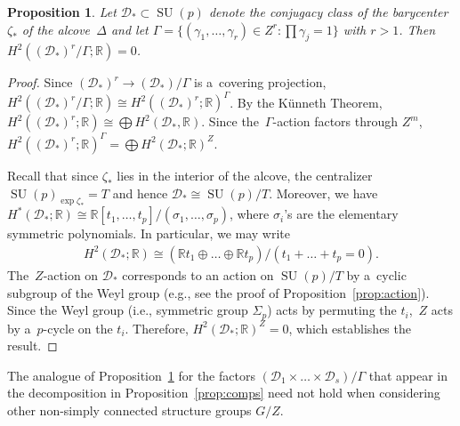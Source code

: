 \documentclass[11pt]{article}
\numberwithin{equation}{section}
\newtheorem{Proposition}[Theorem]{Proposition}
{\theoremstyle{definition}
\newtheorem{Definition}[Theorem]{Definition}
\newtheorem{Example}[Theorem]{Example}
\newtheorem{Remark}[Theorem]{Remark}
}
\DeclareMathOperator{\SU}{SU}
\begin{document}
\begin{Proposition}
\label{prop:nofreeH2}
Let $\mathcal{D}_* \subset \SU(p)$ denote the conjugacy class of the barycenter $\zeta_* $ of the alcove~$\Delta$ and
let $\Gamma = \{(\gamma_1, \ldots, \gamma_r) \in Z^r \colon \prod \gamma_j =1 \}$ with $r>1$.
Then $H^2((\mathcal{D}_*)^r/\Gamma;{\mathbb{R}})=0$.
\end{Proposition}
\begin{proof}
Since $(\mathcal{D}_*)^r \to (\mathcal{D}_*)/\Gamma$ is a~covering projection,
$H^2((\mathcal{D}_*)^r/\Gamma;{\mathbb{R}}) \cong H^2 ((\mathcal{D}_*)^r; {\mathbb{R}})^\Gamma$.
By the K\"unneth Theorem, $H^2((\mathcal{D}_*)^r;{\mathbb{R}}) \cong \bigoplus H^2(\mathcal{D}_*,{\mathbb{R}})$.
Since the~$\Gamma$-action factors through $Z^m$, $H^2 ((\mathcal{D}_*)^r; {\mathbb{R}})^\Gamma = \bigoplus
H^2(\mathcal{D}_*;{\mathbb{R}})^Z$.

Recall that since $\zeta_*$ lies in the interior of the alcove, the centralizer $\SU(p)_{\exp \zeta_*} = T$ and hence
$\mathcal{D}_* \cong \SU(p)/T$.
Moreover, we have $H^*(\mathcal{D}_*;{\mathbb{R}})\cong {\mathbb{R}}[t_1, \ldots, t_p]/(\sigma_1, \ldots, \sigma_p)$,
where $\sigma_i$'s are the elementary symmetric polynomials.
In particular, we may write
\begin{gather*}
H^2(\mathcal{D}_*;{\mathbb{R}}) \cong ({\mathbb{R}} t_1 \oplus \dots \oplus {\mathbb{R}} t_p)/(t_1+ \dots + t_p=0).
\end{gather*}
The~$Z$-action on $\mathcal{D}_*$ corresponds to an action on $\SU(p)/T$ by a~cyclic subgroup of the Weyl group (e.g.,
see the proof of Proposition~\ref{prop:action}).
Since the Weyl group (i.e., symmetric group $\Sigma_p$) acts by permuting the $t_i$,~$Z$ acts by a~$p$-cycle on the $t_i$.
Therefore, $H^2(\mathcal{D}_*;{\mathbb{R}})^Z=0$, which establishes the result.
\end{proof}

\begin{Remark}
\label{remark:lament}
The analogue of Proposition~\ref{prop:nofreeH2} for the factors $(\mathcal{D}_1 \times \dots \times
\mathcal{D}_s)/\Gamma$ that appear in the decomposition in Proposition~\ref{prop:comps} need not hold when considering
other non-simply connected structure groups $G/Z$.
\end{Remark}
\end{document}
